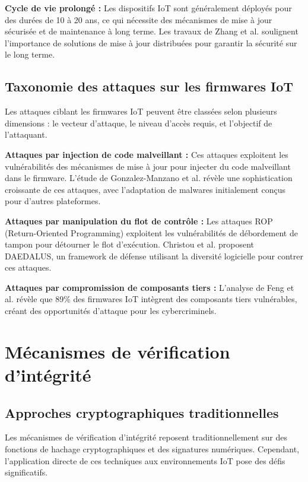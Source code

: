 \textbf{Cycle de vie prolongé :} Les dispositifs IoT sont généralement déployés pour des durées de 10 à 20 ans, ce qui nécessite des mécanismes de mise à jour sécurisée et de maintenance à long terme. Les travaux de Zhang et al. \cite{Zhang2024RobustBlockchain} soulignent l'importance de solutions de mise à jour distribuées pour garantir la sécurité sur le long terme.

\subsection{Taxonomie des attaques sur les firmwares IoT}

Les attaques ciblant les firmwares IoT peuvent être classées selon plusieurs dimensions : le vecteur d'attaque, le niveau d'accès requis, et l'objectif de l'attaquant.

\textbf{Attaques par injection de code malveillant :} Ces attaques exploitent les vulnérabilités des mécanismes de mise à jour pour injecter du code malveillant dans le firmware. L'étude de Gonzalez-Manzano et al. \cite{Gonzalez2024ExploringShifting} révèle une sophistication croissante de ces attaques, avec l'adaptation de malwares initialement conçus pour d'autres plateformes.

\textbf{Attaques par manipulation du flot de contrôle :} Les attaques ROP (Return-Oriented Programming) exploitent les vulnérabilités de débordement de tampon pour détourner le flot d'exécution. Christou et al. \cite{Christou2024DAEDALUS} proposent DAEDALUS, un framework de défense utilisant la diversité logicielle pour contrer ces attaques.

\textbf{Attaques par compromission de composants tiers :} L'analyse de Feng et al. \cite{Feng2022OneBadApple} révèle que 89\% des firmwares IoT intègrent des composants tiers vulnérables, créant des opportunités d'attaque pour les cybercriminels.

\section{Mécanismes de vérification d'intégrité}

\subsection{Approches cryptographiques traditionnelles}

Les mécanismes de vérification d'intégrité reposent traditionnellement sur des fonctions de hachage cryptographiques et des signatures numériques. Cependant, l'application directe de ces techniques aux environnements IoT pose des défis significatifs.

